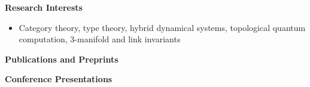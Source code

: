 \documentclass[11pt]{article}
\begin{document}
 {\large \textbf{Research Interests}}
   \begin{itemize}
   \item[]
       Category theory, type theory, hybrid dynamical systems, topological quantum computation, 3-manifold and link invariants %
   \end{itemize}

  {\large \textbf{Publications and Preprints}}


  
  
    
    


  


  {\large \textbf{Conference Presentations}}
\end{document}
